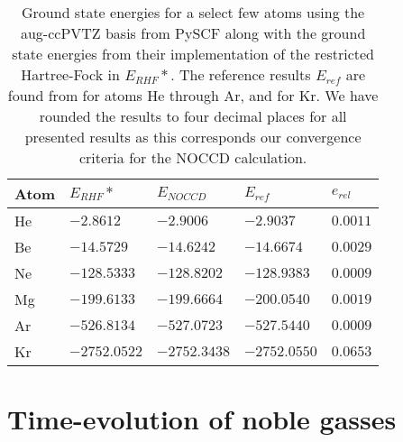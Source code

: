        \begin{table}
            \centering
            \renewcommand{\arraystretch}{1.5}
            \begin{tabular}{@{}lllll@{}}
                \toprule
                Atom & $E_{RHF}*$ & $E_{NOCCD}$ & $E_{ref}$ & $e_{rel}$ \\
                \midrule
                He & $-2.8612$    & $-2.9006$    & $-2.9037$    & $0.0011$ \\
                Be & $-14.5729$   & $-14.6242$   & $-14.6674$   & $0.0029$\\
                Ne & $-128.5333$  & $-128.8202$  & $-128.9383$  & $0.0009$\\
                Mg & $-199.6133$  & $-199.6664$  & $-200.0540$  & $0.0019$\\
                Ar & $-526.8134$  & $-527.0723$  & $-527.5440$  & $0.0009$\\
                Kr & $-2752.0522$ & $-2752.3438$ & $-2752.0550$ & $0.0653$\\
                \bottomrule
            \end{tabular}
            \caption{Ground state energies for a select few atoms using the
            aug-ccPVTZ basis from PySCF \cite{pyscf} along with the ground state
            energies from their implementation of the restricted Hartree-Fock in
            $E_{RHF}*$.
            The reference results $E_{ref}$ are found from
            \citeauthor{Degroote2013} \cite{Degroote2013} for atoms He
            through Ar, and \citeauthor{partridge-nhf} \cite{partridge-nhf} for
            Kr.
            We have rounded the results to four decimal places for all presented
            results as this corresponds our convergence criteria for the NOCCD
            calculation.}
            \label{tab:gs-atoms}
        \end{table}

    \section{Time-evolution of noble gasses}
